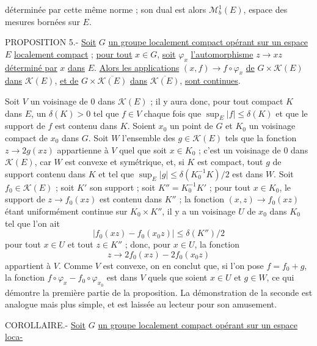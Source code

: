 
déterminée par cette même norme ; son dual est alors $\mathcal M_b^1(E)$, espace des mesures bornées sur $E$.

PROPOSITION 5.- \uline{Soit} $G$ \uline{un groupe localement compact opérant sur un espace} $E$ \uline{localement compact} ; \uline{pour tout} $x\in G$, \uline{soit} $\varphi_x$ \uline{l'automorphisme} $z\to xz$ \uline{déterminé par} $x$ \uline{dans} $E$. \uline{Alors les applications} $(x,f)\to f\circ\varphi_x$ \uline{de} $G\times\mathcal K(E)$ \uline{dans} $\mathcal K(E)$, \uline{et de} $G\times\overline{\mathcal K(E)}$ \uline{dans} $\overline{\mathcal K(E)}$, \uline{sont continues}.

Soit $V$ un voisinage de $0$ dans $\mathcal K(E)$ ; il y aura donc, pour tout compact $K$ dans $E$, un $\delta(K)>0$ tel que $f\in V$ chaque fois que $\sup_E|f|\le\delta(K)$ et que le support de $f$ est contenu dans $K$. Soient $x_0$ un point de $G$ et $K_0$ un voisinage compact de $x_0$ dans $G$. Soit $W$ l'ensemble des $g\in\mathcal K(E)$ tels que la fonction $z\to 2g(xz)$ appartienne à $V$ quel que soit $x\in K_0$ ; c'est un voisinage de $0$ dans $\mathcal K(E)$, car $W$ est convexe et symétrique, et, si $K$ est compact, tout $g$ de support contenu dans $K$ et tel que $\sup_E|g|\le\delta(K_0^{-1}K)/2$ est dans $W$. Soit $f_0\in\mathcal K(E)$ ; soit $K'$ son support ; soit $K''=K_0^{-1}K'$ ; pour tout $x\in K_0$, le support de $z\to f_0(xz)$ est contenu dans $K''$ ; la fonction $(x,z)\to f_0(xz)$ étant uniformément continue sur $K_0\times K''$, il y a un voisinage $U$ de $x_0$ dans $K_0$ tel que l'on ait
\[
|f_0(xz)-f_0(x_0z)|\le\delta(K'')/2
\]
pour tout $x\in U$ et tout $z\in K''$ ; donc, pour $x\in U$, la fonction
\[
z\to 2f_0(xz)-2f_0(x_0z)
\]
appartient à $V$. Comme $V$ est convexe, on en conclut que, si l'on pose $f=f_0+g$, la fonction $f\circ\varphi_x-f_0\circ\varphi_{x_0}$ est dans $V$ quels que soient $x\in U$ et $g\in W$, ce qui démontre la première partie de la proposition. La démonstration de la seconde est analogue mais plus simple, et est laissée au lecteur pour son amusement.

COROLLAIRE.- \uline{Soit} $G$ \uline{un groupe localement compact opérant sur un espace loca-}

